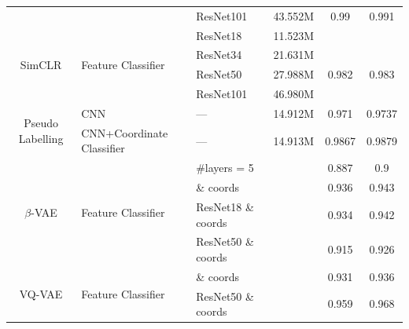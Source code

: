 \documentclass{article}
\begin{document}
\begin{table}[!htp]
\begin{tabular}{cllccc}
                                      &                                                  & ResNet101                   & 43.552M           & 0.99              & 0.991             \\ \cmidrule{1-6}
    \multirow{4}{*}{SimCLR}           & \multirow{4}{*}{Feature Classifier}              & ResNet18                    & 11.523M           &                   &                   \\
                                      &                                                  & ResNet34                    & 21.631M           &                   &                   \\
                                      &                                                  & ResNet50                    & 27.988M           & 0.982             & 0.983             \\
                                      &                                                  & ResNet101                   & 46.980M           &                   &                   \\ \cmidrule{1-6}
    \multirow{2}{*}{Pseudo Labelling} & CNN                                              & ---                         & 14.912M           & 0.971             & 0.9737            \\
                                      & CNN+Coordinate Classifier                        & ---                         & 14.913M           & 0.9867            & 0.9879            \\\cmidrule{1-6}
    \multirow{4}{*}{$\beta$-VAE}      & \multirow{4}{*}{Feature Classifier}              & \#layers = 5                &                   & 0.887             & 0.9               \\
                                      &                                                  & \& coords                   &                   & 0.936             & 0.943             \\
                                      &                                                  & ResNet18          \& coords &                   & 0.934             & 0.942             \\
                                      &                                                  & ResNet50          \& coords &                   & 0.915             & 0.926             \\ \cmidrule{1-6}
    \multirow{2}{*}{VQ-VAE}           & \multirow{2}{*}{Feature Classifier}              & \& coords                   &                   & 0.931             & 0.936             \\
                                      &                                                  & ResNet50          \& coords &                   & 0.959             & 0.968             \\ \midrule
    \bottomrule
  \end{tabular}
\end{table}
\end{document}
